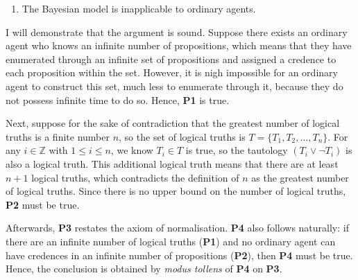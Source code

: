 \documentclass[12pt]{article}
\begin{document}
\begin{enumerate}[resume,label=\textbf{C:}, topsep=0pt, leftmargin=0.5in]
    \item The Bayesian model is inapplicable to ordinary agents.
\end{enumerate}

I will demonstrate that the argument is sound. Suppose there exists an ordinary agent who knows an infinite number of propositions, which means that they have enumerated through an infinite set of propositions and assigned a credence to each proposition within the set. However, it is nigh impossible for an ordinary agent to construct this set, much less to enumerate through it, because they do not possess infinite time to do so. Hence, \textbf{P1} is true.

Next, suppose for the sake of contradiction that the greatest number of logical truths is a finite number $n$, so the set of logical truths is $T=\{T_1,T_2,\dots,T_n\}$. For any $i\in\mathbb{Z}$ with $1\leq i\leq n$, we know $T_i\in T$ is true, so the tautology $(T_i\lor\lnot T_i)$ is also a logical truth. This additional logical truth means that there are at least $n+1$ logical truths, which contradicts the definition of $n$ as the greatest number of logical truths. Since there is no upper bound on the number of logical truths, \textbf{P2} must be true.

Afterwards, \textbf{P3} restates the axiom of normalisation. \textbf{P4} also follows naturally: if there are an infinite number of logical truths (\textbf{P1}) and no ordinary agent can have credences in an infinite number of propositions (\textbf{P2}), then \textbf{P4} must be true. Hence, the conclusion is obtained by \textit{modus tollens} of \textbf{P4} on \textbf{P3}.
\end{document}
